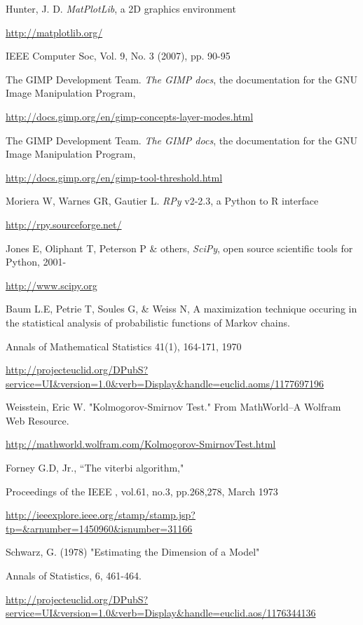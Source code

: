 \documentclass{report}
\begin{document}
\begin{thebibliography}{9}
	Hunter, J. D. \emph{MatPlotLib}, a 2D graphics environment 

	\url{http://matplotlib.org/}

	IEEE Computer Soc, Vol. 9, No. 3 (2007), pp. 90-95

 The GIMP Development Team. \emph{The GIMP docs}, the documentation for the GNU Image Manipulation Program, 

\url{http://docs.gimp.org/en/gimp-concepts-layer-modes.html}

 The GIMP Development Team. \emph{The GIMP docs}, the documentation for the GNU Image Manipulation Program, 

\url{http://docs.gimp.org/en/gimp-tool-threshold.html}

 Moriera W, Warnes GR, Gautier L. \emph{RPy} v2-2.3, a Python to R interface

\url{http://rpy.sourceforge.net/}

 Jones E, Oliphant T, Peterson P \& others, \emph{SciPy}, open source scientific tools for Python, 2001-

\url{http://www.scipy.org}

 Baum L.E, Petrie T, Soules G, \& Weiss N, A maximization technique occuring in the statistical analysis of probabilistic functions of Markov chains.

Annals of Mathematical Statistics 41(1), 164-171, 1970

\url{http://projecteuclid.org/DPubS?service=UI&version=1.0&verb=Display&handle=euclid.aoms/1177697196}

 Weisstein, Eric W. "Kolmogorov-Smirnov Test." From MathWorld--A Wolfram Web Resource.

	\url{http://mathworld.wolfram.com/Kolmogorov-SmirnovTest.html}

 Forney G.D, Jr., ``The viterbi algorithm,"

Proceedings of the IEEE , vol.61, no.3, pp.268,278, March 1973

\url{http://ieeexplore.ieee.org/stamp/stamp.jsp?tp=&arnumber=1450960&isnumber=31166}

 Schwarz, G. (1978) "Estimating the Dimension of a Model"

Annals of Statistics, 6, 461-464.

\url{http://projecteuclid.org/DPubS?service=UI&version=1.0&verb=Display&handle=euclid.aos/1176344136}


\end{thebibliography}
\end{document}
